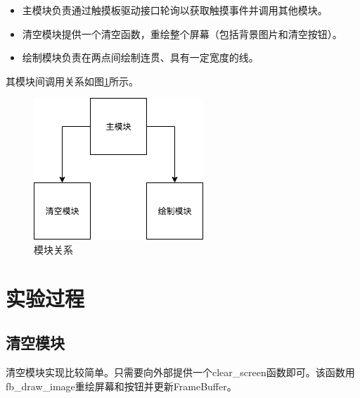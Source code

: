 \documentclass{report}
\begin{document}
\begin{itemize}
    \item 主模块负责通过触摸板驱动接口轮询以获取触摸事件并调用其他模块。
    \item 清空模块提供一个清空函数，重绘整个屏幕（包括背景图片和清空按钮）。
    \item 绘制模块负责在两点间绘制连贯、具有一定宽度的线。
\end{itemize}
\par 其模块间调用关系如图\ref{fig:call}所示。
\begin{figure}[htpb]
    \centering
    \includegraphics[width=0.3\linewidth]{call.png}
    \caption{模块关系}
    \label{fig:call}
\end{figure}

\section{实验过程}
\subsection{清空模块}

\par 清空模块实现比较简单。只需要向外部提供一个clear\_screen函数即可。该函数用fb\_draw\_image重绘屏幕和按钮并更新FrameBuffer。
\end{document}
